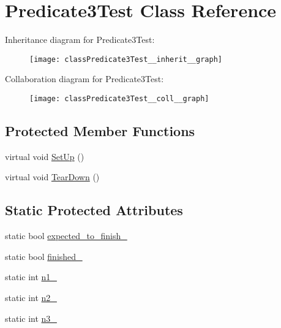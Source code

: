 \hypertarget{classPredicate3Test}{}\section{Predicate3\+Test Class Reference}
\label{classPredicate3Test}


Inheritance diagram for Predicate3\+Test\+:
\nopagebreak
\begin{figure}[H]
\begin{center}
\leavevmode
\texttt{[image: classPredicate3Test\_\_inherit\_\_graph]}
\end{center}
\end{figure}


Collaboration diagram for Predicate3\+Test\+:
\nopagebreak
\begin{figure}[H]
\begin{center}
\leavevmode
\texttt{[image: classPredicate3Test\_\_coll\_\_graph]}
\end{center}
\end{figure}
\subsection*{Protected Member Functions}
\begin{DoxyCompactItemize}
\item 
virtual void \hyperlink{classPredicate3Test_a92aad9566e0737b6739d1db14e7912be}{Set\+Up} ()
\item 
virtual void \hyperlink{classPredicate3Test_aa4dc395bded849b6e5175566d791aba7}{Tear\+Down} ()
\end{DoxyCompactItemize}
\subsection*{Static Protected Attributes}
\begin{DoxyCompactItemize}
\item 
static bool \hyperlink{classPredicate3Test_a42c11555410ee89bf6e59d39336a212c}{expected\+\_\+to\+\_\+finish\+\_\+}
\item 
static bool \hyperlink{classPredicate3Test_aa2ef0fa6aed09d872fb9ae36961b49eb}{finished\+\_\+}
\item 
static int \hyperlink{classPredicate3Test_ac232320a93f0c1e09886148a3e1929a5}{n1\+\_\+}
\item 
static int \hyperlink{classPredicate3Test_a11049ef16bcaadc8262faf7349c7676e}{n2\+\_\+}
\item 
static int \hyperlink{classPredicate3Test_afc1df6b079ffe22b87479b161d2ad2f7}{n3\+\_\+}
\end{DoxyCompactItemize}

